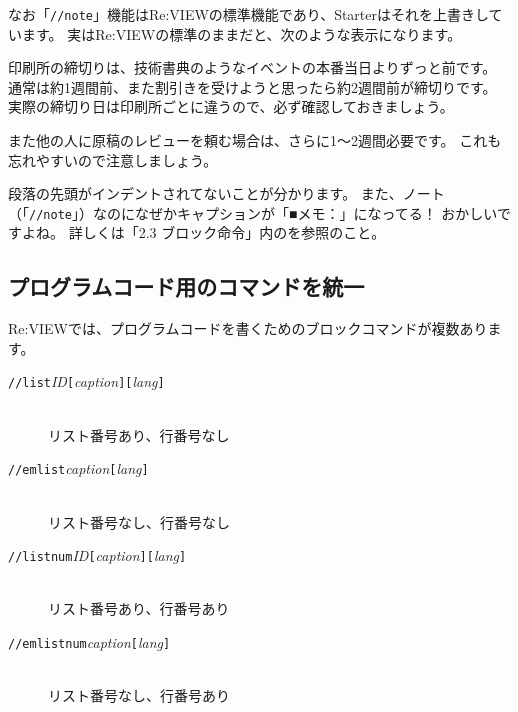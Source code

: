 なお「\texttt{//note}」機能はRe:VIEWの標準機能であり、Starterはそれを上書きしています。
実はRe:VIEWの標準のままだと、次のような表示になります。

\begin{starterprogram}\end{starterprogram}
\noindent
{}

\starterresult
\begin{reviewminicolumn}

印刷所の締切りは、技術書典のようなイベントの本番当日よりずっと前です。
通常は約1週間前、また割引きを受けようと思ったら約2週間前が締切りです。
実際の締切り日は印刷所ごとに違うので、必ず確認しておきましょう。

また他の人に原稿のレビューを頼む場合は、さらに1〜2週間必要です。
これも忘れやすいので注意しましょう。

\end{reviewminicolumn}
\endstarterresult

段落の先頭がインデントされてないことが分かります。
また、ノート（「\texttt{//note}」）なのになぜかキャプションが「■メモ：」になってる！
おかしいですよね。
詳しくは「2.3 ブロック命令」内のを参照のこと。

\subsection*{プログラムコード用のコマンドを統一}
\label{sec:1-1-5}

Re:VIEWでは、プログラムコードを書くためのブロックコマンドが複数あります。

\begin{description}
\item[\texttt{//list\lbrack{}}\textit{ID}\texttt{\rbrack{}[}\textit{caption}\texttt{][}\textit{lang}\texttt{]}] \mbox{} \\
リスト番号あり、行番号なし
\item[\texttt{//emlist\lbrack{}}\textit{caption}\texttt{\rbrack{}[}\textit{lang}\texttt{]}] \mbox{} \\
リスト番号なし、行番号なし
\item[\texttt{//listnum\lbrack{}}\textit{ID}\texttt{\rbrack{}[}\textit{caption}\texttt{][}\textit{lang}\texttt{]}] \mbox{} \\
リスト番号あり、行番号あり
\item[\texttt{//emlistnum\lbrack{}}\textit{caption}\texttt{\rbrack{}[}\textit{lang}\texttt{]}] \mbox{} \\
リスト番号なし、行番号あり
\end{description}

